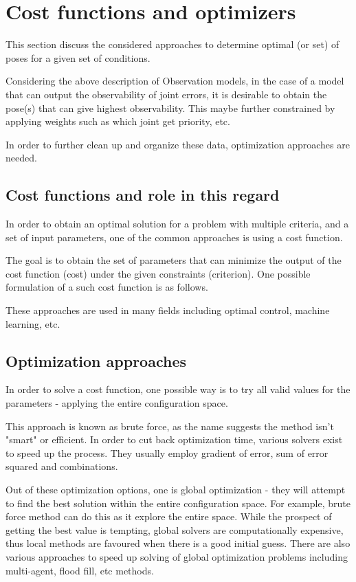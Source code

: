 \documentclass[english, printversion, nomenclature, notitle]{tuvisionthesis} %
\begin{document}
\section{Cost functions and optimizers}

This section discuss the considered approaches to determine optimal (or set) of poses for a given set of conditions.

Considering the above description of Observation models, in the case of a model that can output the observability of joint errors, it is desirable to obtain the pose(s) that can give highest observability. This maybe further constrained by applying weights such as which joint get priority, etc.

In order to further clean up and organize these data, optimization approaches are needed.

\subsection{Cost functions and role in this regard}

In order to obtain an optimal solution for a problem with multiple criteria, and a set of input parameters, one of the common approaches is using a cost function.

The goal is to obtain the set of parameters that can minimize the output of the cost function (cost) under the given constraints (criterion). One possible formulation of a such cost function is as follows.


These approaches are used in many fields including optimal control, machine learning, etc.

\subsection{Optimization approaches}

In order to solve a cost function, one possible way is to try all valid values for the parameters - applying the entire configuration space.

This approach is known as brute force, as the name suggests the method isn't "smart" or efficient. In order to cut back optimization time, various solvers exist to speed up the process. They usually employ gradient of error, sum of error squared and combinations.

Out of these optimization options, one is global optimization - they will attempt to find the best solution within the entire configuration space. For example, brute force method can do this as it explore the entire space. While the prospect of getting the best value is tempting, global solvers are computationally expensive, thus local methods are favoured when there is a good initial guess. There are also various approaches to speed up solving of global optimization problems including multi-agent, flood fill, etc methods. 
\end{document}
